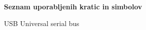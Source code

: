 \textbf{\fontsize{14}{21}\selectfont Seznam uporabljenih kratic in simbolov}
\begin{abbrv}
	\item[USB] Universal serial bus
\end{abbrv}